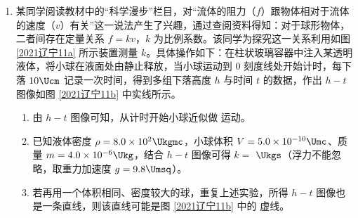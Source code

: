 \documentclass[\gkver]{gaokaozhenti}
\begin{document}
\begin{enumerate}
{代入 $\mu_0\leqslant\mu\leqslant1.2\mu_0$，可得

$L_1<\frac{5h}{3\mu_0}$，$L_1+L_2\geq\frac{2h}{\mu_0}$

综合需满足

$\frac{h}{\mu_0}<L_1<\frac{5h}{3\mu_0}$，$L_1+L_2\geq\frac{2h}{\mu_0}$

故选 CD。
}

\item
某同学阅读教材中的“科学漫步”栏目，对“流体的阻力（$f$）跟物体相对于流体的速度（$v$）有关”这一说法产生了兴趣，通过查阅资料得知：对于球形物体，二者间存在定量关系 $f=kv$，$k$ 为比例系数。该同学为探究这一关系利用如图 \ref{2021辽宁11a} 所示装置测量 $k$。具体操作如下：在柱状玻璃容器中注入某透明液体，将小球在液面处由静止释放，当小球运动到 0 刻度线处开始计时，每下落 $10\Ucm$ 记录一次时间，得到多组下落高度 $h$ 与时间 $t$ 的数据，作出 $h-t$ 图像如图 \ref{2021辽宁11b} 中实线所示。


\begin{enumerate}
	\item
	由 $h-t$ 图像可知，从计时开始小球近似做  运动。
	\item
	已知液体密度 $\rho=8.0\times10^2\Ukgmc$，小球体积 $V=5.0\times10^{-10}\Umc$、质量 $m=4.0\times10^{-6}\Ukg$，结合 $h-t$ 图像可得 $k=$  $\Ukgs$（浮力不能忽略，取重力加速度 $g=9.8\Umsq$）。
	\item
	若再用一个体积相同、密度较大的球，重复上述实验，所得 $h-t$ 图像也是一条直线，则该直线可能是图 \ref{2021辽宁11b} 中的  虚线。
\end{enumerate}

\end{enumerate}
\end{document}

